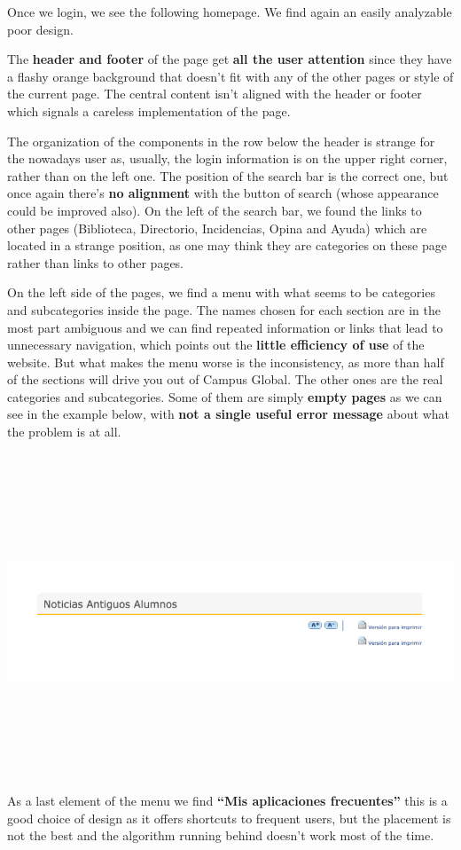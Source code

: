\documentclass{article}
\begin{document}
Once we login, we see the following homepage. We find again an easily analyzable poor design. 

The \textbf{header and footer} of the page get \textbf{all the user attention} since they have a flashy orange background that doesn’t fit with any of the other pages or style of the current page.  
The central content isn’t aligned with the header or footer which signals a careless implementation of the page. 

The organization of the components in the row below the header is strange for the nowadays user as, usually, the login information is on the upper right corner, rather than on the left one. The position of the search bar is the correct one, but once again there’s \textbf{no alignment} with the button of search (whose appearance could be improved also).  On the left of the search bar, we found the links to other pages (Biblioteca, Directorio, Incidencias, Opina and Ayuda) which are located in a strange position, as one may think they are categories on these page rather than links to other pages. 

On the left side of the pages, we find a menu with what seems to be categories and subcategories inside the page. The names chosen for each section are in the most part ambiguous and we can find repeated information or links that lead to unnecessary navigation, which points out the \textbf{little efficiency of use} of the website. But what makes the menu worse is the inconsistency, as more than half of the sections will drive you out of Campus Global. The other ones are the real categories and subcategories. Some of them are simply \textbf{empty pages} as we can see in the example below, with \textbf{not a single useful error message} about what the problem is at all.

\includegraphics[width=15cm, height=10cm, keepaspectratio]{noticiasantiguos}
As a last element of the menu we find \textbf{“Mis aplicaciones frecuentes”} this is a good choice of design as it offers shortcuts to frequent users, but the placement is not the best and the algorithm running behind doesn’t work most of the time.
\end{document}
